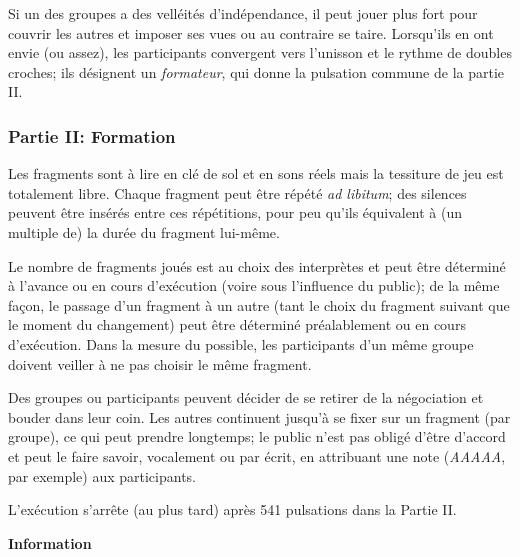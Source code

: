 \documentclass[a4paper,11pt,bibliography=totoc,numbers=noenddot,listof=flat,DIV=11,BCOR=0mm]{scrreprt}%
\begin{document}

Si un des groupes a des velléités d'indépendance, il peut jouer plus fort pour couvrir les autres et imposer ses vues ou au contraire se taire. Lorsqu'ils en ont envie (ou assez), les participants convergent vers l'unisson et le rythme de doubles croches; ils désignent un \emph{formateur}, qui donne la pulsation commune de la partie II.

\subsubsection*{Partie II: \og Formation \fg{}}
Les fragments sont à lire en clé de sol et en sons réels mais la tessiture de jeu est totalement libre. Chaque fragment peut être répété \emph{ad libitum}; des silences peuvent être insérés entre ces répétitions, pour peu qu'ils équivalent à (un multiple de) la durée du fragment lui-même.

Le nombre de fragments joués est au choix des interprètes et peut être déterminé à l'avance ou en cours d'exécution (voire sous l'influence du public); de la même façon, le passage d'un fragment à un autre (tant le choix du fragment suivant que le moment du changement) peut être déterminé préalablement ou en cours d'exécution. Dans la mesure du possible, les participants d'un même groupe doivent veiller à ne pas choisir le même fragment.

Des groupes ou participants peuvent décider de se retirer de la négociation et bouder dans leur coin. Les autres continuent jusqu'à se fixer sur un fragment (par groupe), ce qui peut prendre longtemps; le public n'est pas obligé d'être d'accord et peut le faire savoir, vocalement ou par écrit, en attribuant une \og note \fg{} (\emph{AAAAA}, par exemple) aux participants.

L'exécution s'arrête (au plus tard) après 541 pulsations dans la Partie II.

\newpage	
\begin{center}
{\Large \textbf{Information}}
\end{center}
\vspace{0.5cm}
\end{document}
